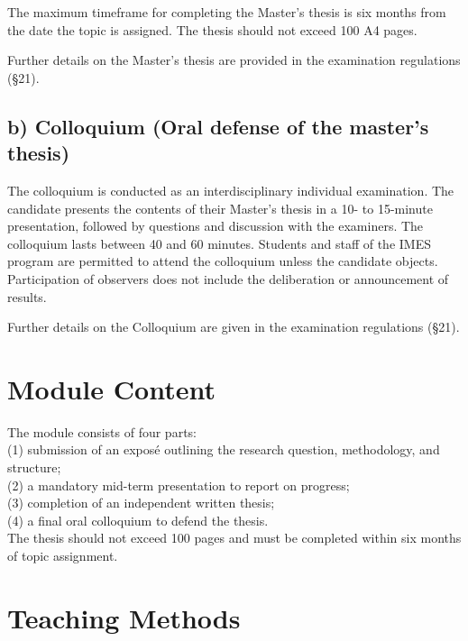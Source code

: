 \documentclass[
  letterpaper,
  10pt,
  openany]{book}
\begin{document}
The maximum timeframe for completing the Master's thesis is six months
from the date the topic is assigned. The thesis should not exceed 100 A4
pages.

Further details on the Master's thesis are provided in the examination
regulations (§21).

\subsection*{b) Colloquium (Oral defense of the master's
thesis)}\label{b-colloquium-oral-defense-of-the-masters-thesis}

The colloquium is conducted as an interdisciplinary individual
examination. The candidate presents the contents of their Master's
thesis in a 10- to 15-minute presentation, followed by questions and
discussion with the examiners. The colloquium lasts between 40 and 60
minutes. Students and staff of the IMES program are permitted to attend
the colloquium unless the candidate objects. Participation of observers
does not include the deliberation or announcement of results.

Further details on the Colloquium are given in the examination
regulations (§21).

\section*{Module Content}\label{module-content-7}


The module consists of four parts:\\
(1) submission of an exposé outlining the research question,
methodology, and structure;\\
(2) a mandatory mid-term presentation to report on progress;\\
(3) completion of an independent written thesis;\\
(4) a final oral colloquium to defend the thesis.\\
The thesis should not exceed 100 pages and must be completed within six
months of topic assignment.

\section*{Teaching Methods}\label{teaching-methods-7}
\end{document}
